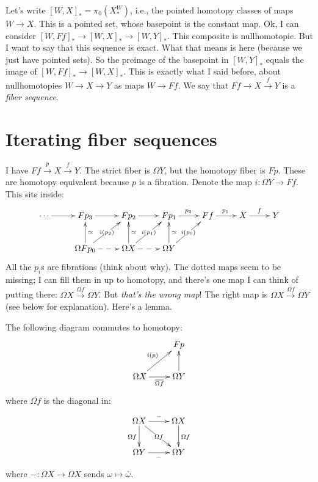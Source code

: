 Let's write $[W,X]_\ast = \pi_0(X^W_\ast)$, i.e., the pointed homotopy classes of maps $W\to X$. This is a pointed set, whose basepoint is the constant map. Ok, I can consider $[W,Ff]_\ast\to [W,X]_\ast\to [W,Y]_\ast$. This composite is nullhomotopic. But I want to say that this sequence is exact. What that means is here (because we just have pointed sets). So the preimage of the basepoint in $[W,Y]_\ast$ equals the image of $[W,Ff]_\ast\to [W,X]_\ast$. This is exactly what I said before, about nullhomotopies $W\to X\to Y$ as maps $W\to Ff$. We say that $Ff\to X\xrightarrow{f}Y$ is a \emph{fiber sequence}.

\section{Iterating fiber sequences}
I have $Ff\xrightarrow{p} X\xrightarrow{f} Y$. The strict fiber is $\Omega Y$, but the homotopy fiber is $Fp$. These are homotopy equivalent because $p$ is a fibration. Denote the map $i:\Omega Y\to Ff$. This sits inside:
\begin{equation*}
    \xymatrix{
	\cdots\ar[r] & Fp_3 \ar[r] & Fp_2\ar[r] & Fp_1\ar[r]^{p_2} & Ff\ar[r]^{p_1} & X\ar[r]^{f} & Y\\
	& \Omega Fp_0\ar[u]_{\simeq}\ar[ur]|{i(p_2)}\ar@{-->}[r] & \Omega X\ar@{-->}[r]\ar[u]_{\simeq}\ar[ur]|{i(p_1)} & \Omega Y\ar[u]_\simeq \ar[ur]|{i(p_0)} & &
    }
\end{equation*}
All the $p_i$s are fibrations (think about why). The dotted maps seem to be missing; I can fill them in up to homotopy, and there's one map I can think of putting there: $\Omega X\xrightarrow{\Omega f}\Omega Y$. But \emph{that's the wrong map}! The right map is $\Omega X\xrightarrow{\overline{\Omega f}}\Omega Y$ (see below for explanation). Here's a lemma.
\begin{lemma}
    The following diagram commutes to homotopy:
    \begin{equation*}
	\xymatrix{
	    & Fp\\
	    \Omega X\ar[r]_{\overline{\Omega f}}\ar[ur]^{i(p)} & \Omega Y\ar[u]
	    }
    \end{equation*}
    where $\overline{\Omega f}$ is the diagonal in:
    \begin{equation*}
	\xymatrix{
	    \Omega X\ar[r]^{-}\ar[dr]|{\Omega f} \ar[d]_{\Omega f} & \Omega X\ar[d]^{\Omega f}\\
	    \Omega Y\ar[r]_{-} & \Omega Y
	    }
    \end{equation*}
    where $-:\Omega X\to \Omega X$ sends $\omega\mapsto\overline{\omega}$.
\end{lemma}
